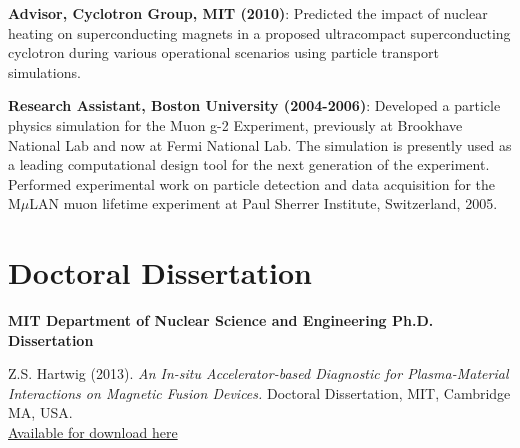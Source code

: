 \documentclass[10pt]{article}
\begin{document}
\begin{innerlist}
\item \textbf{Advisor, Cyclotron Group, MIT (2010)}: Predicted the
  impact of nuclear heating on superconducting magnets in a proposed
  ultracompact superconducting cyclotron during various operational
  scenarios using particle transport simulations.\vspace{0.2cm}

\item \textbf{Research Assistant, Boston University (2004-2006)}:
  Developed a particle physics simulation for the Muon g-2 Experiment,
  previously at Brookhave National Lab and now at Fermi National Lab.
  The simulation is presently used as a leading computational design
  tool for the next generation of the experiment. Performed
  experimental work on particle detection and data acquisition for the
  M$\mu$LAN muon lifetime experiment at Paul Sherrer Institute,
  Switzerland, 2005.
\end{innerlist}

\newpage
{}

\section{Doctoral Dissertation}
\textbf{MIT Department of Nuclear Science and Engineering Ph.D. Dissertation}
\begin{innerlist}
\item Z.S. Hartwig (2013). \textit{An In-situ Accelerator-based Diagnostic
  for Plasma-Material Interactions on Magnetic Fusion Devices.}
Doctoral Dissertation, MIT, Cambridge MA,
USA.\\ \href{http://www.psfc.mit.edu/library1/catalog/reports/2010/13rr/13rr012/13rr012_full.pdf}{Available
  for download here}
\end{innerlist}
\end{document}
